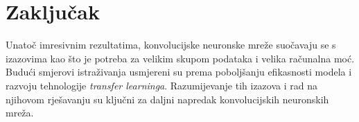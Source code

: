 
\chapter{Zaključak}\label{ch:zakljucak}
Unatoč imresivnim rezultatima, konvolucijske neuronske mreže suočavaju se s izazovima kao što je potreba za velikim skupom podataka i velika računalna moć.
Budući smjerovi istraživanja usmjereni su prema poboljšanju efikasnosti modela i razvoju tehnologije \emph{transfer learninga}.
Razumijevanje tih izazova i rad na njihovom rješavanju su ključni za daljni napredak konvolucijskih neuronskih mreža.